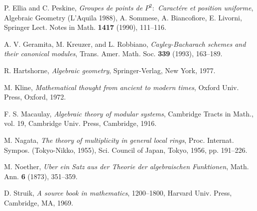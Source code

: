 \documentclass{bull-l}
\theoremstyle{pplain}
\theoremstyle{definition}
\begin{document}
\begin{thebibliography}{EGH2}
 P. Ellia and C. Peskine, \emph{Groupes de points de $P^2:$
Caract\'ere et position uniforme}, Algebraic Geometry (L'Aquila 1988), A.
Sommese, A. Biancofiore, E. Livorni, Springer Lect. Notes in Math. 
\textbf{1417} (1990), 111--116.

 A. V. Geramita, M. Kreuzer, and L. Robbiano, \emph{
Cayley-Bacharach schemes and their canonical modules},  Trans. Amer. Math. Soc.
\textbf{339} (1993), 163--189. 

 R. Hartshorne, \emph{Algebraic geometry}, Springer-Verlag, New
York, 1977. 

 M. Kline, \emph{Mathematical thought from ancient to modern 
times}, Oxford Univ. Press, Oxford, 1972. 

 F. S. Macaulay, \emph{Algebraic theory of modular systems},
Cambridge Tracts in Math., vol. 19, Cambridge Univ. Press, Cambridge, 1916.

 M. Nagata, \emph{The theory of multiplicity in general local
rings}, Proc. Internat.  Sympos. (Tokyo-Nikko, 1955), Sci.  Council of Japan,
Tokyo, 1956, pp. 191--226. 

 M. Noether, \emph{Uber ein Satz aus der Theorie der
algebraischen Funktionen}, Math. Ann. \textbf{6} (1873), 351--359.

 D. Struik, \emph{A source book in mathematics}, 1200--1800,
Harvard Univ. Press, Cambridge, MA, 1969. 
\end{thebibliography}
\end{document}
